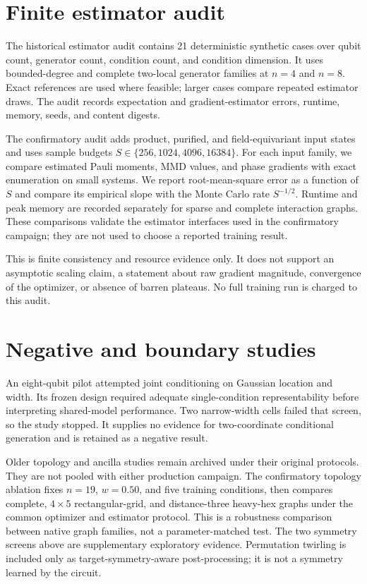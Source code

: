 \section{Finite estimator audit}
\label{app:estimator-audit}

The historical estimator audit contains 21 deterministic synthetic cases over
qubit count, generator count, condition count, and condition dimension. It
uses bounded-degree and complete two-local generator families at $n=4$ and
$n=8$. Exact references are used where feasible; larger cases compare repeated
estimator draws. The audit records expectation and gradient-estimator errors,
runtime, memory, seeds, and content digests.

The confirmatory audit adds product, purified, and field-equivariant input
states and uses sample budgets
$S\in\{256,1024,4096,16384\}$. For each input family, we compare estimated
Pauli moments, MMD values, and phase gradients with exact enumeration on small
systems. We report root-mean-square error as a function of $S$ and compare its
empirical slope with the Monte Carlo rate $S^{-1/2}$. Runtime and peak memory
are recorded separately for sparse and complete interaction graphs. These
comparisons validate the estimator interfaces used in the confirmatory
campaign; they are not used to choose a reported training result.

This is finite consistency and resource evidence only. It does not support an
asymptotic scaling claim, a statement about raw gradient magnitude, convergence
of the optimizer, or absence of barren plateaus. No full training run is
charged to this audit.

\section{Negative and boundary studies}

An eight-qubit pilot attempted joint conditioning on Gaussian location and
width. Its frozen design required adequate single-condition representability
before interpreting shared-model performance. Two narrow-width cells failed
that screen, so the study stopped. It supplies no evidence for
two-coordinate conditional generation and is retained as a negative result.

Older topology and ancilla studies remain archived under their original
protocols. They are not pooled with either production campaign. The
confirmatory topology ablation fixes $n=19$, $w=0.50$, and five training
conditions, then compares complete, $4\times5$ rectangular-grid, and
distance-three heavy-hex graphs under the common optimizer and estimator
protocol. This is a robustness comparison between native graph families, not
a parameter-matched test. The two
symmetry screens above are supplementary exploratory evidence. Permutation
twirling is included only as target-symmetry-aware post-processing; it is not
a symmetry learned by the circuit.

